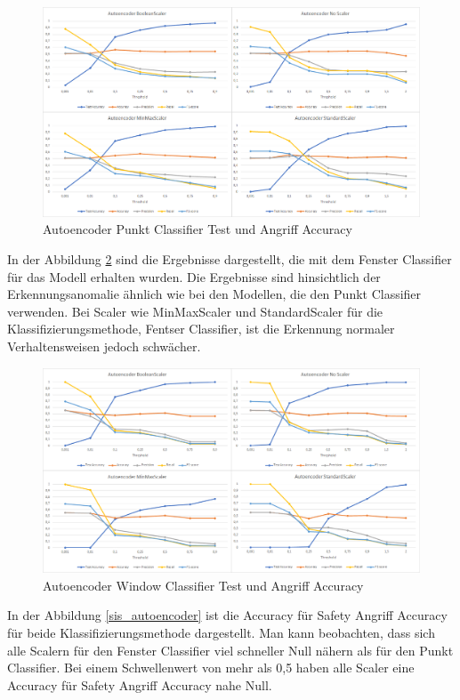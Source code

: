 \documentclass[12pt,a4paper]{scrartcl}
\numberwithin{equation}{section}
\begin{document}
\begin{figure}[ht!]
	\centering
	  \includegraphics[scale=0.5]{autoencoder_40.png}
	  \caption{Autoencoder Punkt Classifier Test und Angriff Accuracy}
	\label{autoencoder_40}
\end{figure}

In der Abbildung \ref{autoencoder_40_classifier} sind die Ergebnisse dargestellt, die mit dem Fenster Classifier für das Modell erhalten wurden. Die Ergebnisse sind hinsichtlich der Erkennungsanomalie ähnlich wie bei den Modellen, die den Punkt Classifier verwenden. Bei Scaler wie MinMaxScaler und StandardScaler für die Klassifizierungsmethode, Fentser Classifier, ist die Erkennung normaler Verhaltensweisen jedoch schwächer. 

\begin{figure}[ht!]
	\centering
	  \includegraphics[scale=0.5]{autoencoder_40_classifier.png}
	  \caption{Autoencoder Window Classifier Test und Angriff Accuracy}
	\label{autoencoder_40_classifier}
\end{figure}

In der Abbildung \ref{sis_autoencoder} ist die Accuracy für Safety Angriff Accuracy für beide Klassifizierungsmethode dargestellt. Man kann beobachten, dass sich alle Scalern für den Fenster Classifier viel schneller Null nähern als für den Punkt Classifier. Bei einem Schwellenwert von mehr als 0,5 haben alle Scaler eine Accuracy für Safety Angriff Accuracy nahe Null. 
\end{document}
